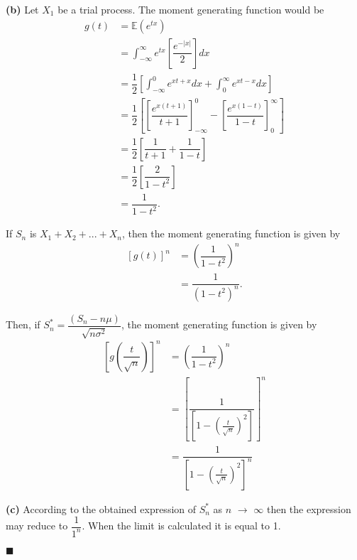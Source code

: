 \documentclass[10pt,leter,openany]{article}
\begin{document}
\textbf{(b)} Let $X_{1}$ be a trial process. The moment generating function would be \begin{equation*}
	\begin{aligned}
		g(t) & = \mathbb{E}(e^{tx}) \\
		& = \int_{-\infty}^{\infty} e^{tx}   \left[ \dfrac{e^{-|x|}}{2} \right] dx \\
		& = \dfrac{1}{2}\left[ \int_{-\infty}^{0}e^{xt+x} dx + \int_{0}^{\infty}e^{xt-x}dx \right] \\
		& = \dfrac{1}{2} \left[ \left[     \dfrac{e^{x(t+1)}}{t+1} \right]_{-\infty}^{0} -  \left[   \dfrac{e^{x(1-t)}}{1-t}     \right]_{0}^{\infty}     \right] \\
		& = \dfrac{1}{2} \left[   \dfrac{1}{t+1} + \dfrac{1}{1-t}    \right] \\
		& = \dfrac{1}{2} \left[   \dfrac{2}{1-t^{2}}  \right] \\
		& = \dfrac{1}{1-t^{2}}.
	\end{aligned}	
\end{equation*}

If $S_{n}$ is $X_{1} + X_{2} + ... + X_{n}$, then the moment generating function is given by \begin{equation*}
	\begin{aligned}
	\left[ g(t)\right] ^{n} & =  \left( \dfrac{1}{1-t^{2}}\right) ^{n}\\
	& = \dfrac{1}{(1-t^{2})^{n}}.
	\end{aligned}
\end{equation*}

Then, if $S_{n}^{*} = \dfrac{(S_{n}-n\mu)}{\sqrt{n\sigma^{2}}}   $, the moment generating function is given by \begin{equation*}
	\begin{aligned}
		\left[ g\left(   \dfrac{t}{\sqrt{n}}\right) \right] ^{n} & =  \left( \dfrac{1}{1-t^{2}}\right) ^{n}\\
		& = \left[ \dfrac{1}{\left[ 1- \left( \frac{t}{\sqrt{n}}\right) ^{2}\right] } \right]^{n}\\
		& = \dfrac{1}{\left[ 1- \left( \frac{t}{\sqrt{n}}\right) ^{2}\right]^{n} }
	\end{aligned}
\end{equation*}

\textbf{(c)} According to the obtained expression of  $S_{n}^{*} $ as $ n $ $\rightarrow$ $\infty$ then the expression may reduce to $\dfrac{1}{1^{n}}$. When the limit is calculated it is equal to 1.

				\begin{flushright}
				$\blacksquare $ 
			\end{flushright}
		
\clearpage

	
	
	
\end{document}
